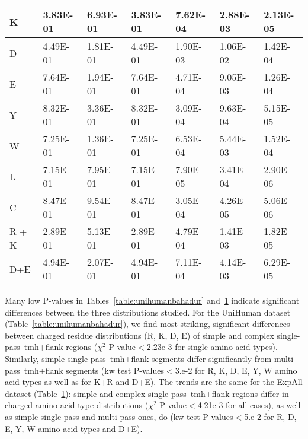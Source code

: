\begin{table}[htbp]
{\begin{tabular}{ p{5em} l l l l l l }
    \midrule
     K    & 3.83E-01 & 6.93E-01 & 3.83E-01 & 7.62E-04 & 2.88E-03 & 2.13E-05 \\
    \midrule
     D    & 4.49E-01 & 1.81E-01 & 4.49E-01 & 1.90E-03 & 1.06E-02 & 1.42E-04 \\
    \midrule
     E    & 7.64E-01 & 1.94E-01 & 7.64E-01 & 4.71E-04 & 9.05E-03 & 1.26E-04 \\
    \midrule
     Y    & 8.32E-01 & 3.36E-01 & 8.32E-01 & 3.09E-04 & 9.63E-04 & 5.15E-05 \\
    \midrule
     W    & 7.25E-01 & 1.36E-01 & 7.25E-01 & 6.53E-04 & 5.44E-03 & 1.52E-04 \\
    \midrule
     L    & 7.15E-01 & 7.95E-01 & 7.15E-01 & 7.90E-05 & 3.41E-04 & 2.90E-06 \\
    \midrule
     C    & 8.47E-01 & 9.54E-01 & 8.47E-01 & 3.05E-04 & 4.26E-05 & 5.06E-06 \\
    \midrule
     R + K & 2.89E-01 & 5.13E-01 & 2.89E-01 & 4.79E-04 & 1.41E-03 & 1.82E-05 \\
    \midrule
     D+E & 4.94E-01 & 2.07E-01 & 4.94E-01 & 7.11E-04 & 4.14E-03 & 6.29E-05 \\
    \bottomrule
    \end{tabular}%
    }%
   \label{table:expallbahadur}

\end{table}%

Many low P-values in Tables~\ref{table:unihumanbahadur} and~\ref{table:expallbahadur} indicate significant differences between the three distributions studied.
For the UniHuman dataset (Table~\ref{table:unihumanbahadur}), we find most striking, significant differences between charged residue distributions (R, K, D, E) of simple and complex single-pass~\gls{tmh}+flank regions (\({\chi}^{2}\) P-value$<$2.23e-3 for single amino acid types).
Similarly, simple single-pass~\gls{tmh}+flank segments differ significantly from multi-pass~\gls{tmh}+flank segments (\gls{kw} test P-values$<$3.e-2 for R, K, D, E, Y, W amino acid types as well as for K+R and D+E).
The trends are the same for the ExpAll dataset (Table~\ref{table:expallbahadur}): simple and complex single-pass~\gls{tmh}+flank regions differ in charged amino acid type distributions (\({\chi}^{2}\) P-value$<$4.21e-3 for all cases), as well as simple single-pass and multi-pass ones, do (\gls{kw} test P-values$<$5.e-2 for R, D, E, Y, W amino acid types and D+E).

